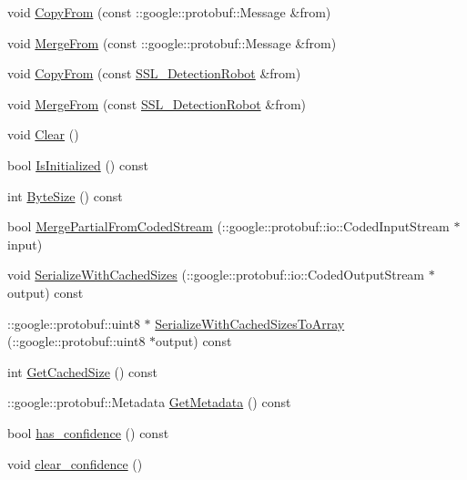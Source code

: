 \begin{DoxyCompactItemize}
\item 
void \hyperlink{class_s_s_l___detection_robot_add6cafd56486af2f804cd24843998e7a}{Copy\-From} (const \-::google\-::protobuf\-::\-Message \&from)
\item 
void \hyperlink{class_s_s_l___detection_robot_a91500faf0b5ccbcbb6cb86aa8c760f71}{Merge\-From} (const \-::google\-::protobuf\-::\-Message \&from)
\item 
void \hyperlink{class_s_s_l___detection_robot_a27c442d87f0d539ec3048a91b632f524}{Copy\-From} (const \hyperlink{class_s_s_l___detection_robot}{S\-S\-L\-\_\-\-Detection\-Robot} \&from)
\item 
void \hyperlink{class_s_s_l___detection_robot_a844a35e84ece8f33b8082a71c641ca25}{Merge\-From} (const \hyperlink{class_s_s_l___detection_robot}{S\-S\-L\-\_\-\-Detection\-Robot} \&from)
\item 
void \hyperlink{class_s_s_l___detection_robot_a7b13b06b23c971e470faf7e33f44064c}{Clear} ()
\item 
bool \hyperlink{class_s_s_l___detection_robot_a143dd622d883ff4fb65619ba2d141db8}{Is\-Initialized} () const 
\item 
int \hyperlink{class_s_s_l___detection_robot_a3fa777fd31c6187eeb4205f83084f7d2}{Byte\-Size} () const 
\item 
bool \hyperlink{class_s_s_l___detection_robot_a2bbbb529dbf6b9fa6d5d6466d0c8921e}{Merge\-Partial\-From\-Coded\-Stream} (\-::google\-::protobuf\-::io\-::\-Coded\-Input\-Stream $\ast$input)
\item 
void \hyperlink{class_s_s_l___detection_robot_ade88fb5955b7754099d7c11067da00ef}{Serialize\-With\-Cached\-Sizes} (\-::google\-::protobuf\-::io\-::\-Coded\-Output\-Stream $\ast$output) const 
\item 
\-::google\-::protobuf\-::uint8 $\ast$ \hyperlink{class_s_s_l___detection_robot_a179b0d562adbaf4d3ed4ed0ca835a632}{Serialize\-With\-Cached\-Sizes\-To\-Array} (\-::google\-::protobuf\-::uint8 $\ast$output) const 
\item 
int \hyperlink{class_s_s_l___detection_robot_a985e441fba31e5a750aebca798ecec3b}{Get\-Cached\-Size} () const 
\item 
\-::google\-::protobuf\-::\-Metadata \hyperlink{class_s_s_l___detection_robot_aee67700b91772b2841db96f8fc98b502}{Get\-Metadata} () const 
\item 
bool \hyperlink{class_s_s_l___detection_robot_ac93d3192da665905bf6ef4527df2add9}{has\-\_\-confidence} () const 
\item 
void \hyperlink{class_s_s_l___detection_robot_a049f82db1c0c7e18fbac0ddeb05947c6}{clear\-\_\-confidence} ()

\end{DoxyCompactItemize}
